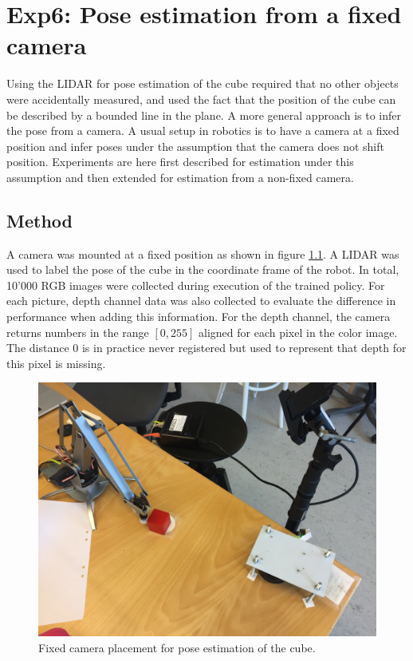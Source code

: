 \chapter{Exp6: Pose estimation from a fixed camera}

Using the LIDAR for pose estimation of the cube required that no other objects
were accidentally measured, and used the fact that the position of the cube can
be described by a bounded line in the plane. A more general approach is to infer
the pose from a camera. A usual setup in robotics is to have a camera at a
fixed position and infer poses under the assumption that the camera does not
shift position. Experiments are here first described for estimation under this
assumption and then extended for estimation from a non-fixed camera.

\section{Method}

A camera was mounted at a fixed position as shown in figure
\ref{fig:camera_placement_fixed}. A LIDAR was used to label the pose of the
cube in the coordinate frame of the robot. In total, 10'000 RGB images were
collected during execution of the trained policy. For each picture, depth
channel data was also collected to evaluate the difference in performance when
adding this information. For the depth channel, the camera returns numbers in
the range $[0, 255]$ aligned for each pixel in the color image. The distance
$0$ is in practice never registered but used to represent that depth for this
pixel is missing.

\begin{figure}[h!]
    \centering
    \includegraphics[width=0.4 \textwidth]{res/camera_placement_fixed.jpg}

    \caption{Fixed camera placement for pose estimation of the cube.}

    \label{fig:camera_placement_fixed}
    
\end{figure}

